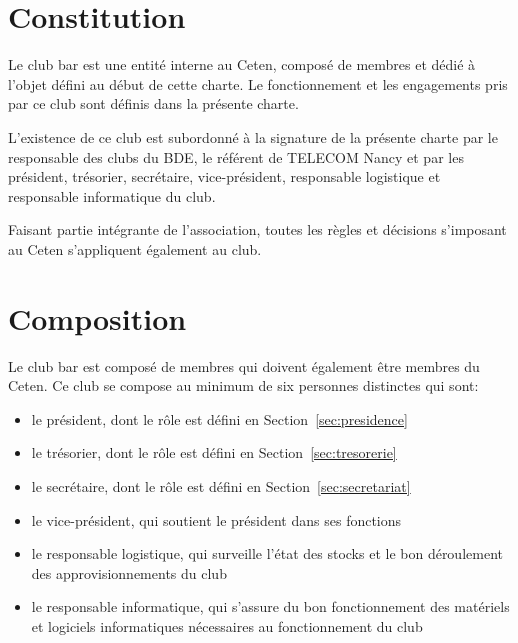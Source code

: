 \documentclass{article} %
\begin{document}


	\begin{multicols}{2}

		\section{Constitution}
\label{sec:constitution}
		
		{\small

			Le club bar est une entité interne au Ceten, composé de membres et
			dédié à l'objet défini au début de cette charte. Le fonctionnement
			et les engagements pris par ce club sont définis dans la présente
			charte.

			L'existence de ce club est subordonné à la signature de la présente
			charte par le responsable des clubs du BDE, le référent de TELECOM
			Nancy et par les président, trésorier, secrétaire, vice-président,
			responsable logistique et responsable informatique du club.
			
			Faisant partie intégrante de l’association, toutes les règles et
			décisions s’imposant au Ceten s’appliquent également au club.

		}

		\section{Composition}
\label{sec:composition}

		{\small
		
			Le club bar est composé de membres qui doivent également être
			membres du Ceten. Ce club se compose au minimum de six personnes
			distinctes qui sont:
			\begin{itemize}
				\item le président, dont le rôle est défini en
					Section~\ref{sec:presidence}
				\item le trésorier, dont le rôle est défini en
					Section~\ref{sec:tresorerie}
				\item le secrétaire, dont le rôle est défini en
					Section~\ref{sec:secretariat}
				\item le vice-président, qui soutient le président dans ses
					fonctions
				\item le responsable logistique, qui surveille l'état des stocks
					et le bon déroulement des approvisionnements du club
				\item le responsable informatique, qui s'assure du bon
					fonctionnement des matériels et logiciels informatiques
					nécessaires au fonctionnement du club
			\end{itemize}

}
\end{multicols}
\end{document}
